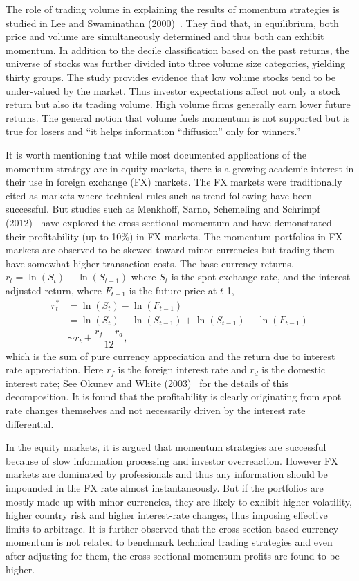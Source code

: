 The role of trading volume in explaining the results of momentum strategies is studied in Lee and Swaminathan (2000)~\cite{lee2000}. They find that, in equilibrium, both price and volume are simultaneously determined and thus both can exhibit momentum. In addition to the decile classification based on the past returns, the universe of stocks was further divided into three volume size categories, yielding thirty groups. The study provides evidence that low volume stocks tend to be under-valued by the market. Thus investor expectations affect not only a stock return but also its trading volume. High volume firms generally earn lower future returns. The general notion that volume fuels momentum is not supported but is true for losers and ``it helps information ``diffusion'' only for winners.''


It is worth mentioning that while most documented applications of the momentum strategy are in equity markets, there is a growing academic interest in their use in foreign exchange (FX) markets. The FX markets were traditionally cited as markets where technical rules such as trend following have been successful. But studies such as Menkhoff, Sarno, Schemeling and Schrimpf (2012)~\cite{menkhoff2012} have explored the cross-sectional momentum and have demonstrated their profitability (up to 10\%) in FX markets. The momentum portfolios in FX markets are observed to be skewed toward minor currencies but trading them have somewhat higher transaction costs. The base currency returns, $r_t= \ln(S_t) - \ln(S_{t-1})$ where $S_t$ is the spot exchange rate, and the interest-adjusted return, where $F_{t-1}$ is the future price at $t$-1,
	\begin{equation}
	\begin{split}
	r_t^* &= \ln(S_t) - \ln(F_{t-1}) \\
	&= \ln(S_t) - \ln(S_{t-1}) + \ln(S_{t-1}) - \ln(F_{t-1}) \\
	&\sim r_t + \dfrac{r_f - r_d}{12},
	\end{split}
	\end{equation}
which is the sum of pure currency appreciation and the return due to interest rate appreciation. Here $r_f$ is the foreign interest rate and $r_d$ is the domestic interest rate; See Okunev and White (2003)~\cite{okunev2003} for the details of this decomposition. It is found that the profitability is clearly originating from spot rate changes themselves and not necessarily driven by the interest rate differential.


In the equity markets, it is argued that momentum strategies are successful because of slow information processing and investor overreaction. However FX markets are dominated by professionals and thus any information should be impounded in the FX rate almost instantaneously. But if the portfolios are mostly made up with minor currencies, they are likely to exhibit higher volatility, higher country risk and higher interest-rate changes, thus imposing effective limits to arbitrage. It is further observed that the cross-section based currency momentum is not related to benchmark technical trading strategies and even after adjusting for them, the cross-sectional momentum profits are found to be higher. \\


